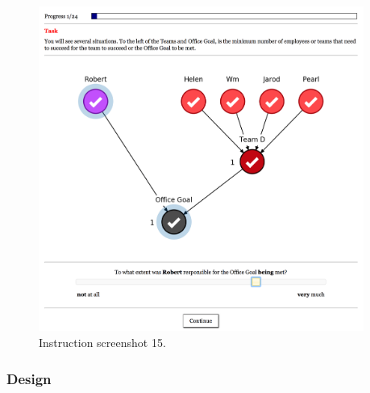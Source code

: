 \documentclass[11pt]{article}
\begin{document}
\begin{figure}[H]
	\centering
	\includegraphics[width=0.95\textwidth]{screenshot_15}
	\caption{Instruction screenshot 15.}
	\label{fig:screenshot_15}
\end{figure}

\subsubsection{Design}
\label{ssub:design}

\begin{figure}[H]
\setcounter{subfigure}{-1} %
\renewcommand{\thesubfigure}{\arabic{subfigure}}
\centering
{\hfill}
\hfill
{}
\hfill
{}
\hfill
{}
{\hfill}
\end{figure}
\end{document}
